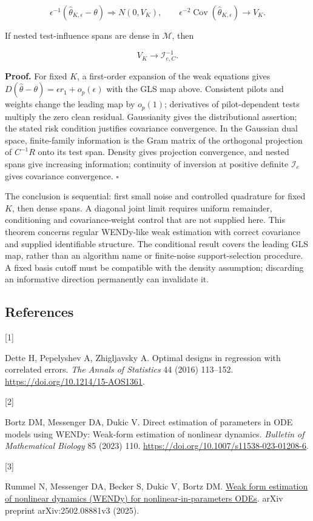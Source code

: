 \documentclass[
  american,
  11pt,
]{article}
\newlength{\cslhangindent}
\newlength{\csllabelwidth}
\newenvironment{CSLReferences}[2] %
 {\begin{list}{}{%
  \setlength{\itemindent}{0pt}
  \setlength{\leftmargin}{0pt}
  \setlength{\parsep}{0pt}
  \ifodd #1
   \setlength{\leftmargin}{\cslhangindent}
   \setlength{\itemindent}{-1\cslhangindent}
  \fi
  \setlength{\itemsep}{#2\baselineskip}}}
 {\end{list}}
\newcommand{\CSLLeftMargin}[1]{\parbox[t]{\csllabelwidth}{\strut#1\strut}}
\newcommand{\CSLRightInline}[1]{\parbox[t]{\linewidth - \csllabelwidth}{\strut#1\strut}}
\begin{document}
\[
\epsilon^{-1}(\widehat\theta_{K,\epsilon}-\theta)
\Rightarrow N(0,V_K),\qquad
\epsilon^{-2}\operatorname{Cov}(\widehat\theta_{K,\epsilon})\to V_K.
\]

If nested test-influence spans are dense in \(\mathcal M\), then

\[
V_K\longrightarrow\mathcal I_{e,C}^{-1}.
\]

\textbf{Proof.} For fixed \(K\), a first-order expansion of the weak
equations gives \(D(\widehat\theta-\theta)=\epsilon r_1+o_p(\epsilon)\)
with the GLS map above. Consistent pilots and weights change the leading
map by \(o_p(1)\); derivatives of pilot-dependent tests multiply the
zero clean residual. Gaussianity gives the distributional assertion; the
stated risk condition justifies covariance convergence. In the Gaussian
dual space, finite-family information is the Gram matrix of the
orthogonal projection of \(C^{-1}R\) onto its test span. Density gives
projection convergence, and nested spans give increasing information;
continuity of inversion at positive definite \(\mathcal I_e\) gives
covariance convergence. \(\square\)

The conclusion is sequential: first small noise and controlled
quadrature for fixed \(K\), then dense spans. A diagonal joint limit
requires uniform remainder, conditioning and covariance-weight control
that are not supplied here. This theorem concerns regular WENDy-like
weak estimation with correct covariance and supplied identifiable
structure. The conditional result covers the leading GLS map, rather
than an algorithm name or finite-noise support-selection procedure. A
fixed basis cutoff must be compatible with the density assumption;
discarding an informative direction permanently can invalidate it.

\subsection*{References}\label{references}

\protect{}\label{refs}
\begin{CSLReferences}{0}{0}
\CSLLeftMargin{{[}1{]} }%
\CSLRightInline{Dette H, Pepelyshev A, Zhigljavsky A. Optimal designs in
regression with correlated errors. \emph{The Annals of Statistics} 44
(2016) 113--152. \url{https://doi.org/10.1214/15-AOS1361}.}

\CSLLeftMargin{{[}2{]} }%
\CSLRightInline{Bortz DM, Messenger DA, Dukic V. Direct estimation of
parameters in {ODE} models using {WENDy}: Weak-form estimation of
nonlinear dynamics. \emph{Bulletin of Mathematical Biology} 85 (2023)
110. \url{https://doi.org/10.1007/s11538-023-01208-6}.}

\CSLLeftMargin{{[}3{]} }%
\CSLRightInline{Rummel N, Messenger DA, Becker S, Dukic V, Bortz DM.
\href{https://arxiv.org/abs/2502.08881v3}{Weak form estimation of
nonlinear dynamics ({WENDy}) for nonlinear-in-parameters {ODEs}}. arXiv
preprint arXiv:2502.08881v3 (2025).}

\end{CSLReferences}
\end{document}
